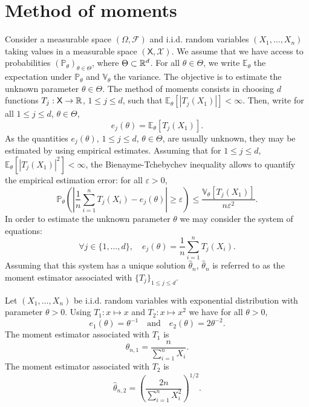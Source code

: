 \documentclass[english,graybox,envcountchap,envcountsame,sectrefs,shortlabels]{svmono}
\theoremstyle{style}
\newcommand{\eqsp}{}
\newcommand{\Xset}{\mathsf{X}}
\newcommand{\Xsigma}{\mathcal{X}}
\begin{document}
\section{Method of moments}
Consider a measurable space $(\Omega,\mathcal{F})$ and i.i.d. random variables $(X_1,\ldots,X_n)$ taking values in a measurable space $(\Xset,\Xsigma)$. We assume that we have access to probabilities $(\mathbb{P}_\theta)_{\theta\in\Theta}$, where $\Theta \subset\mathbb{R}^d$. For all $\theta\in\Theta$, we write $\mathbb{E}_\theta$ the expectation under $\mathbb{P}_\theta$ and $\mathbb{V}_\theta$ the variance. The objective is to estimate the unknown parameter $\theta\in\Theta$. The method of moments consists in choosing $d$ functions $T_j:\Xset\to \rset$, $1\leq j\leq d$, such that $\mathbb{E}_\theta[|T_j(X_1)|]<\infty$. Then, write for all $1\leq j \leq d$, $\theta\in\Theta$,
$$
e_j(\theta) = \mathbb{E}_\theta[T_j(X_1)]\eqsp.
$$
As the quantities $e_j(\theta)$, $1\leq j \leq d$, $\theta\in\Theta$,  are usually unknown, they may be estimated by using empirical estimates. Assuming that for $1\leq j\leq d$, $\mathbb{E}_\theta[|T_j(X_1)|^2]<\infty$, the Bienayme-Tchebychev inequality allows to quantify the empirical estimation error: for all $\varepsilon>0$,
$$
\mathbb{P}_\theta\left(\left|\frac{1}{n}\sum_{i=1}^{n}T_j(X_i)-e_j(\theta)\right|\geq \varepsilon\right) \leq \frac{\mathbb{V}_\theta[T_j(X_1)]}{n\varepsilon^2}\eqsp.
$$
In order to estimate the unknown parameter $\theta$ we may consider the system of equations:
$$
\forall j\in\{1,\ldots,d\},\quad e_j(\theta) = \frac{1}{n}\sum_{i=1}^n T_j(X_i)\eqsp.
$$
Assuming that this system has a unique solution $\widehat \theta_n$, $\widehat \theta_n$ is referred to as the moment estimator associated with $\{T_j\}_{1\leq j\leq d}$.

\begin{example}
Let $(X_1,\ldots,X_n)$ be i.i.d. random variables with exponential distribution with parameter $\theta>0$. Using $T_1:x\mapsto x$ and $T_2:x\mapsto x^2$ we have for all $\theta>0$,
$$
e_1(\theta) = \theta^{-1}\quad\mathrm{and}\quad e_2(\theta) = 2\theta^{-2}\eqsp.
$$
The moment estimator associated with $T_1$ is
$$
\widehat \theta_{n,1} = \frac{n}{\sum_{i=1}^nX_i}\eqsp.
$$
The moment estimator associated with $T_2$ is
$$
\widehat \theta_{n,2} = \left(\frac{2n}{\sum_{i=1}^nX^2_i}\right)^{1/2}\eqsp.
$$
\end{example}
\end{document}
